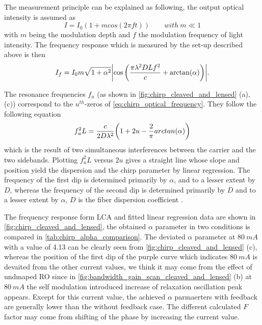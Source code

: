 The measurement principle can be explained as following, the output optical intensity is assumed as \cite{devaux1993simple}
\begin{equation}
    I=I_0(1+mcos(2\pi ft)) \qquad with \ m \ll 1
    \label{eq:chirp_optical_intensity}
\end{equation}
with $m$ being the modulation depth and $f$ the modulation frequency of light intensity. The frequency response which is measured by the set-up described above is then \cite{devaux1993simple}
\begin{equation}
    I_f=I_0m\sqrt{1+\alpha^2}\abs{\cos\qty(\frac{\pi\lambda^2DLf^2}{c}+\arctan(\alpha))}.
    \label{eq:chirp_optical_frequency}
\end{equation}

The resonance frequencies $f_u$ (as shown in \autoref{fig:chirp_cleaved_and_lensed} (a), (c)) correspond to the $u^{th}$-zeros of \autoref{eq:chirp_optical_frequency}. They follow the following equation \cite{devaux1993simple}
\begin{equation}
    f_u^2L=\frac{c}{2D\lambda ^2}\qty(1+2u-\frac{2}{\pi}arctan(\alpha))
    \label{eq:LCA_equation}
\end{equation}
which is the result of two simultaneous interferences between the carrier and the two sidebands. Plotting $f_u^2L$ versus $2u$ gives a straight line whose slope and position yield the dispersion and the chirp parameter by linear regression. The frequency of the first dip is determined primarily by $\alpha$, and to a lesser extent by $D$, whereas the frequency of the second dip is determined primarily by $D$ and to a lesser extent by $\alpha$, $D$ is the fiber dispersion coefficient \cite{srinivasan1995using}.

The frequency response form LCA and fitted linear regression data are shown in \autoref{fig:chirp_cleaved_and_lensed}, the obtained $\alpha$ parameter in two conditions is compared in \autoref{tab:chirp_alpha_comparison}. The deviated $\alpha$ parameter at $80 \ mA$ with a value of 4.13 can be clearly seen from \autoref{fig:chirp_cleaved_and_lensed} (c), whereas the position of the first dip of the purple curve which indicates $80 \ mA$ is devaited from the other current values, we think it may come from the effect of undmaped RO since in \autoref{fig:bandwidth_gain_scan_cleaved_and_lensed} (b) at $80 \ mA$ the self modulation introduced increase of relaxation oscillation peak appears. Except for this current value, the achieved $\alpha$ parmaerters with feedback are generally lower than the without feedback case. The different calculated $F$ factor may come from shifting of the phase by increasing the current value.

